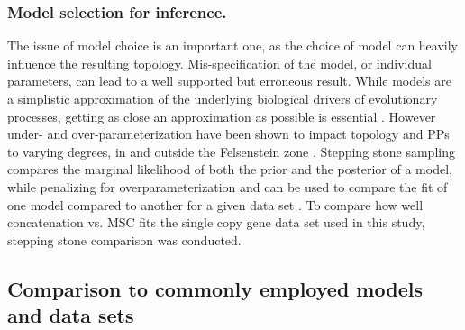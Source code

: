 \documentclass[fleqn,10pt,lineno]{wlpeerj} %
\begin{document}
\subsubsection*{Model selection for inference.} The issue of model choice is an important one, as the choice of model can heavily influence the resulting topology. 
Mis-specification of the model, or individual parameters, can lead to a well supported but erroneous result. 
While models are a simplistic approximation of the underlying biological drivers of evolutionary processes, getting as close an approximation as possible is essential \citep{box1979all}. 
However under- and over-parameterization have been shown to impact topology and PPs to varying degrees, in and outside the Felsenstein zone \citep{lemmon2004importance}. 
Stepping stone sampling compares the marginal likelihood of both the prior and the posterior of a model, while penalizing for overparameterization and can be used to compare the fit of one model compared to another for a given data set \citep{xie2010improving}. 
To compare how well concatenation vs. MSC fits the single copy gene data set used in this study, stepping stone comparison was conducted.

\subsection*{Comparison to commonly employed models and data sets}
\end{document}
